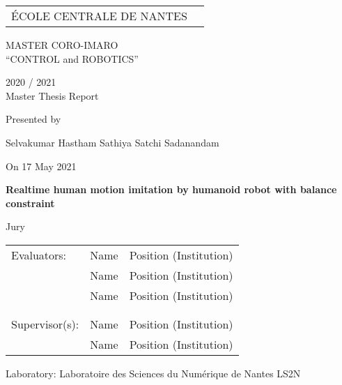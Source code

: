 \thispagestyle{empty}

\def\lskip{\vspace{0.5cm}}


\begin{tabular}{p{7cm}p{8cm}}
ÉCOLE CENTRALE DE NANTES
&
\end{tabular}

\vspace{2cm}

\begin{center} \large\sc MASTER CORO-IMARO\\ \normalsize{``CONTROL and ROBOTICS''} \end{center}



\begin{center}
	2020 / 2021\\
	\lskip
	Master Thesis Report %
	\lskip
	
	Presented by \lskip 
	
	Selvakumar Hastham Sathiya Satchi Sadanandam \lskip
	
	On 17 May 2021 \lskip\lskip
	
	{\Large \textbf{Realtime human motion imitation by humanoid robot with balance constraint}}
	
	\vfill

Jury \lskip
		
	\end{center}
	


\begin{tabular}{p{3cm}p{7cm}p{5cm} }
 Evaluators: & Name & Position (Institution) \\
	      & Name & Position (Institution) \\ 
	      & Name & Position (Institution) \\ & & \\  & & \\ 
  Supervisor(s):  & Name & Position (Institution) \\
		  & Name & Position (Institution) \\
\end{tabular}

\lskip

\begin{flushleft}
 Laboratory: Laboratoire des Sciences du Numérique de Nantes LS2N
\end{flushleft}

\newpage
\thispagestyle{empty}
\null
\newpage
\addtocounter{page}{-1}
\pagestyle{fancy}
